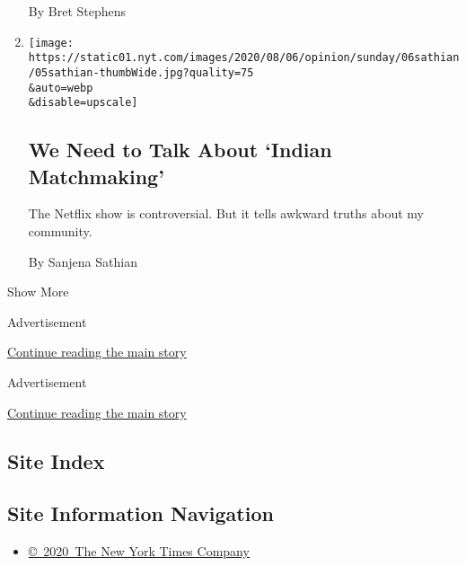 \begin{enumerate}
  By Bret Stephens
\item
  \href{/2020/08/05/opinion/sunday/indian-matchmaking-netflix.html}{}

  \texttt{[image: https://static01.nyt.com/images/2020/08/06/opinion/sunday/06sathian/05sathian-thumbWide.jpg?quality=75\\\&auto=webp\\\&disable=upscale]}

  \hypertarget{we-need-to-talk-about-indian-matchmaking}{%
  \subsection{We Need to Talk About `Indian
  Matchmaking'}\label{we-need-to-talk-about-indian-matchmaking}}

  The Netflix show is controversial. But it tells awkward truths about
  my community.

  By Sanjena Sathian
\end{enumerate}

Show More

Advertisement

\protect\hyperlink{after-mid1}{Continue reading the main story}

Advertisement

\protect\hyperlink{after-mktg}{Continue reading the main story}

\hypertarget{site-index}{%
\subsection{Site Index}\label{site-index}}

\hypertarget{site-information-navigation}{%
\subsection{Site Information
Navigation}\label{site-information-navigation}}

\begin{itemize}
\tightlist
\item
  \href{https://help.nytimes.com/hc/en-us/articles/115014792127-Copyright-notice}{©~2020~The
  New York Times Company}
\end{itemize}

